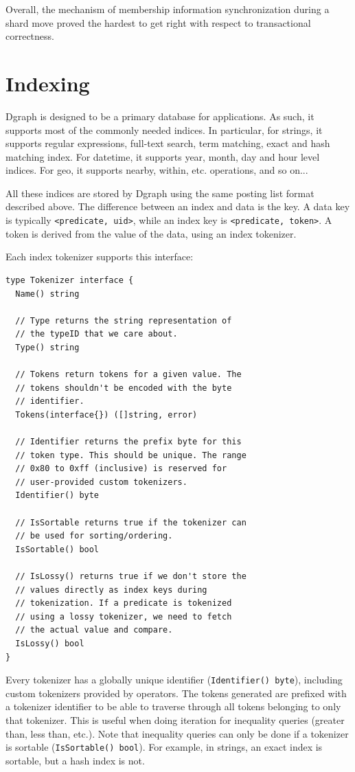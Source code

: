 \documentclass[letterpaper,twocolumn,10pt]{article}
\begin{document}
Overall, the mechanism of membership information synchronization during a shard
move proved the hardest to get right with respect to transactional correctness.

\section{Indexing}

Dgraph is designed to be a primary database for applications. As such, it
supports most of the commonly needed indices. In particular, for strings, it
supports regular expressions, full-text search, term matching, exact and hash
matching index. For datetime, it supports year, month, day and hour level
indices. For geo, it supports nearby, within, etc. operations, and so on...

All these indices are stored by Dgraph using the same posting list format
described above. The difference between an index and data is the key. A data key
is typically \texttt{<predicate, uid>}, while an index key is
\texttt{<predicate, token>}. A token is derived from the value of the data,
using an index tokenizer.

Each index tokenizer supports this interface:

\begin{verbatim}
type Tokenizer interface {
  Name() string

  // Type returns the string representation of
  // the typeID that we care about.
  Type() string

  // Tokens return tokens for a given value. The
  // tokens shouldn't be encoded with the byte
  // identifier.
  Tokens(interface{}) ([]string, error)

  // Identifier returns the prefix byte for this
  // token type. This should be unique. The range
  // 0x80 to 0xff (inclusive) is reserved for
  // user-provided custom tokenizers.
  Identifier() byte

  // IsSortable returns true if the tokenizer can
  // be used for sorting/ordering.
  IsSortable() bool

  // IsLossy() returns true if we don't store the
  // values directly as index keys during
  // tokenization. If a predicate is tokenized
  // using a lossy tokenizer, we need to fetch
  // the actual value and compare.
  IsLossy() bool
}
\end{verbatim}

Every tokenizer has a globally unique identifier (\texttt{Identifier() byte}),
including custom tokenizers provided by operators. The tokens generated are
prefixed with a tokenizer identifier to be able to traverse through all tokens
belonging to only that tokenizer. This is useful when doing iteration for
inequality queries (greater than, less than, etc.). Note that inequality queries
can only be done if a tokenizer is sortable (\texttt{IsSortable() bool}). For
example, in strings, an exact index is sortable, but a hash index is not.
\end{document}
